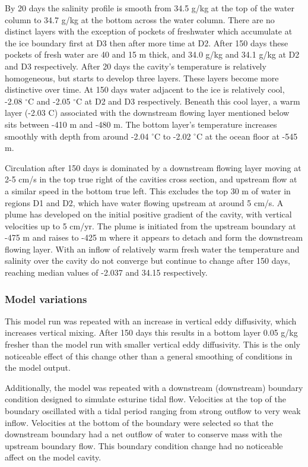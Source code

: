 By 20 days the salinity profile is smooth from 34.5  g/kg at the top of the water column to 34.7 g/kg at the bottom across the water column. There are no distinct layers with the exception of pockets of freshwater which accumulate at the ice boundary first at D3 then after more time at D2. After 150 days these pockets of fresh water are 40 and 15 m thick, and 34.0 g/kg and 34.1 g/kg at D2 and D3 respectively. After 20 days the cavity's temperature is relatively homogeneous, but starts to develop three layers. These layers become more distinctive over time. At 150 days water adjacent to the ice is relatively cool, -2.08 $^{\circ}$C and -2.05 $^{\circ}$C at D2 and D3 respectively. Beneath this cool layer, a warm layer (-2.03 \textdegree C) associated with the downstream flowing layer mentioned below sits between -410 m and -480 m. The bottom layer's temperature increases smoothly with depth from around -2.04 $^{\circ}$C to -2.02 $^{\circ}$C at the ocean floor at -545 m.  

Circulation after 150 days is dominated by a downstream flowing layer moving at 2-5 cm/s in the top true right of the cavities cross section, and upstream flow at a similar speed in the bottom true left.  This excludes the top 30 m of water in regions D1 and D2, which have water flowing upstream at around 5 cm/s. 
A plume has developed on the initial positive gradient of the cavity, with vertical velocities up to 5 cm/yr. The plume is initiated from the upstream boundary at -475 m and raises to -425 m where it appears to detach and form the downstream flowing layer.
With an inflow of relatively warm fresh  water the temperature and salinity over the cavity do not converge but continue to change after 150 days, reaching median values of -2.037 and 34.15 respectively.

\subsubsection{Model variations}
This model run was repeated with an increase in vertical eddy diffusivity, which increases vertical mixing. After 150 days this results in a bottom layer 0.05  g/kg fresher than the model run with smaller vertical eddy diffusivity. This is the only noticeable effect of this change other than a general smoothing of conditions in the model output. 

Additionally, the model was repeated with a downstream (downstream) boundary condition designed to simulate esturine tidal flow. Velocities at the top of the boundary oscillated with a tidal period ranging from strong outflow to very weak inflow. Velocities at the bottom of the boundary were selected so that the downstream boundary had a net outflow of water to conserve mass with the upstream boundary flow. This boundary condition change had no noticeable affect on the model cavity.

